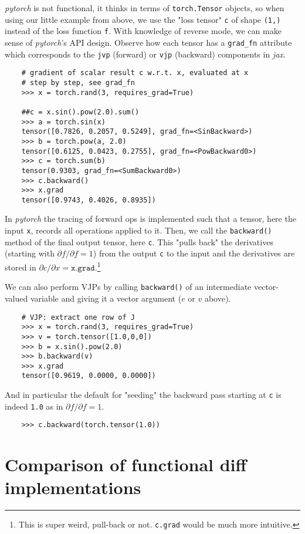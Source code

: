 \documentclass[parskip,paper=a4,11pt,headsepline]{scrartcl}
\newcommand{\ve}[1]{\ensuremath{\bm{\mathit{#1}}}}
\newcommand{\pdi}[2]{\partial #1/\partial #2}
\newcommand{\soft}[1]{\textsl{#1}\xspace}
\newcommand{\pytorch}{\soft{pytorch}}
\newcommand{\jax}{\soft{jax}}
\newcommand{\co}[1]{\texttt{#1}}
\begin{document}
\pytorch is not functional, it thinks in terms of \co{torch.Tensor} objects, so
when using our little example from above, we use the "loss tensor" \co{c} of
shape \co{(1,)} instead of the loss function \co{f}. With knowledge of reverse
mode, we can make sense of \pytorch's API design. Observe how each tensor has a
\verb|grad_fn| attribute which corresponds to the \co{jvp} (forward) or
\co{vjp} (backward) components in \jax.
%
\begin{verbatim}
    # gradient of scalar result c w.r.t. x, evaluated at x
    # step by step, see grad_fn
    >>> x = torch.rand(3, requires_grad=True)

    ##c = x.sin().pow(2.0).sum()
    >>> a = torch.sin(x)
    tensor([0.7826, 0.2057, 0.5249], grad_fn=<SinBackward>)
    >>> b = torch.pow(a, 2.0)
    tensor([0.6125, 0.0423, 0.2755], grad_fn=<PowBackward0>)
    >>> c = torch.sum(b)
    tensor(0.9303, grad_fn=<SumBackward0>)
    >>> c.backward()
    >>> x.grad
    tensor([0.9743, 0.4026, 0.8935])
\end{verbatim}
%
In \pytorch the tracing of forward ops is implemented such that a tensor, here
the input \co{x}, records all operations applied to it. Then, we call the
\co{backward()} method of the final output tensor, here \co{c}. This
"pulls back" the derivatives (starting with $\pdi{f}{f}=1$) from the output
\co{c} to the input and the derivatives are stored in $\pdi{c}{\ve x} =
\co{x.grad}$.\footnote{This is super weird, pull-back or not.
\co{c.grad} would be much more intuitive.}

We can also perform VJPs by calling \co{backward()} of an intermediate
vector-valued variable and giving it a vector argument ($\ve
e$ or $\ve v$ above).
%
\begin{verbatim}
    # VJP: extract one row of J
    >>> x = torch.rand(3, requires_grad=True)
    >>> v = torch.tensor([1.0,0,0])
    >>> b = x.sin().pow(2.0)
    >>> b.backward(v)
    >>> x.grad
    tensor([0.9619, 0.0000, 0.0000])
\end{verbatim}
And in particular the default for "seeding" the backward pass starting at \co{c}
is indeed \co{1.0} as in $\pdi{f}{f}=1$.
\begin{verbatim}
    >>> c.backward(torch.tensor(1.0))
\end{verbatim}

\section{Comparison of functional diff implementations}
\end{document}
